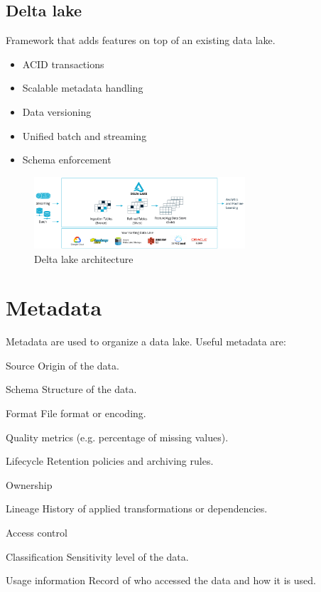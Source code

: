 \subsection{Delta lake} 
Framework that adds features on top of an existing data lake.
\begin{itemize}
    \item ACID transactions
    \item Scalable metadata handling
    \item Data versioning
    \item Unified batch and streaming
    \item Schema enforcement
\end{itemize}
\begin{figure}[ht]
    \centering
    \includegraphics[width=0.7\textwidth]{img/delta_lake.png}
    \caption{Delta lake architecture}
\end{figure}


\section{Metadata}
Metadata are used to organize a data lake.
Useful metadata are:
\begin{descriptionlist}
    \item[Source] Origin of the data.
    \item[Schema] Structure of the data.
    \item[Format] File format or encoding.
    \item[Quality metrics] (e.g. percentage of missing values).
    \item[Lifecycle] Retention policies and archiving rules.
    \item[Ownership] 
    \item[Lineage] History of applied transformations or dependencies.
    \item[Access control] 
    \item[Classification] Sensitivity level of the data.
    \item[Usage information] Record of who accessed the data and how it is used.
\end{descriptionlist}